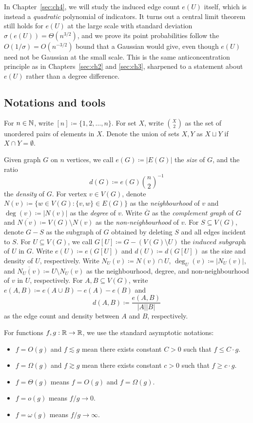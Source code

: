In Chapter~\ref{sec:ch4}, we will study the induced edge count $e(U)$ itself, which is instead a \textit{quadratic} polynomial of indicators. It turns out a central limit theorem still holds for $e(U)$ at the large scale with standard deviation $\sigma(e(U)) = \Theta(n^{3/2})$, and we prove its point probabilities follow the $O(1/\sigma) = O(n^{-3/2})$ bound that a Gaussian would give, even though $e(U)$ need not be Gaussian at the small scale. This is the same anticoncentration principle as in Chapters~\ref{sec:ch2} and \ref{sec:ch3}, sharpened to a statement about $e(U)$ rather than a degree difference.

\subsection{Notations and tools}

For $n \in \mathbb{N}$, write $[n] \coloneqq \{1, 2, \ldots, n\}$. For set $X$, write $\binom{X}{2}$ as the set of unordered pairs of elements in $X$. Denote the union of sets $X, Y$ as $X \sqcup Y$ if $X \cap Y = \emptyset$.

Given graph $G$ on $n$ vertices, we call $e(G) \coloneqq |E(G)|$ the \textit{size} of $G$, and the ratio 
\[
  d(G) \coloneqq e(G)\binom{n}{2}^{-1}
\]
the \textit{density} of $G$. For vertex $v \in V(G)$, denote $N(v) \coloneqq \{w \in V(G) : \{v, w\} \in E(G)\}$ as the \textit{neighbourhood} of $v$ and $\deg(v) \coloneqq |N(v)|$ as the \textit{degree} of $v$. Write $\overline{G}$ as the \textit{complement graph} of $G$ and $\overline{N(v)} \coloneqq V(G) \setminus N(v)$ as the \textit{non-neighbourhood} of $v$. For $S \subseteq V(G)$, denote $G - S$ as the subgraph of $G$ obtained by deleting $S$ and all edges incident to $S$. For $U \subseteq V(G)$, we call $G[U] \coloneqq G - (V(G) \setminus U)$ the $\textit{induced subgraph}$ of $U$ in $G$. Write $e(U) \coloneqq e(G[U])$ and $d(U) \coloneqq d(G[U])$ as the size and density of $U$, respectively. Write $N_U(v) \coloneqq N(v) \cap U$, $\deg_U(v) \coloneqq |N_U(v)|$, and $\overline{N_U(v)} \coloneqq U \setminus N_U(v)$ as the neighbourhood, degree, and non-neighbourhood of $v$ in $U$, respectively. For $A, B \subseteq V(G)$, write $e(A, B) \coloneqq e(A \cup B) - e(A) - e(B)$ and
\[
  d(A, B) \coloneqq \frac{e(A, B)}{|A||B|}
\]
as the edge count and density between $A$ and $B$, respectively.

For functions $f, g: \mathbb{R} \to \mathbb{R}$, we use the standard asymptotic notations:
\begin{itemize}
\item $f = O(g)$ and $f \lesssim g$ mean there exists constant $C > 0$ such that $f \leq C \cdot g$.
\item $f = \Omega(g)$ and $f \gtrsim g$ mean there exists constant $c > 0$ such that $f \geq c \cdot g$.
\item $f = \Theta(g)$ means $f = O(g)$ and $f = \Omega(g)$.
\item $f = o(g)$ means $f/g \to 0$.
\item $f = \omega(g)$ means $f/g \to \infty$.
\end{itemize}

